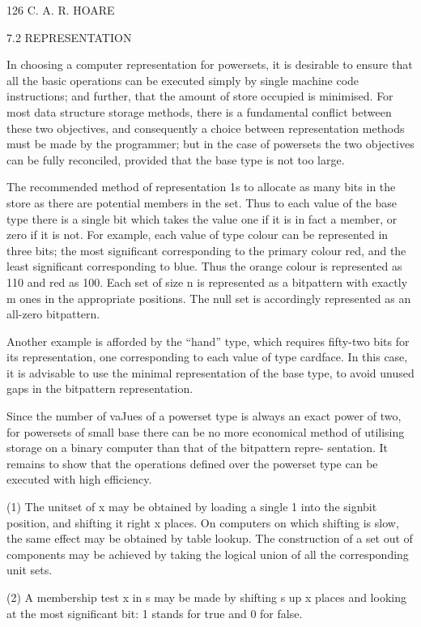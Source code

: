 {{{{				126 C. A. R. HOARE
				
				7.2 REPRESENTATION
				
				In choosing a computer representation for powersets, it is desirable to ensure that all the basic operations can be executed simply by single machine code instructions; and further, that the amount of store occupied is minimised. For most data structure storage methods, there is a fundamental conflict between these two objectives, and consequently a choice between representation methods must be made by the programmer; but in the case of powersets the two objectives can be fully reconciled, provided that the base type is not too large.
				
				The recommended method of representation 1s to allocate as many bits in the store as there are potential members in the set. Thus to each value of the base type there is a single bit which takes the value one if it is in fact a member, or zero if it is not. For example, each value of type colour can be represented in three bits; the most significant corresponding to the primary colour red, and the least significant corresponding to blue. Thus the orange colour is represented as 110 and red as 100. Each set of size n is represented as a bitpattern with exactly m ones in the appropriate positions. The null set is accordingly represented as an all-zero bitpattern.
				
				Another example is afforded by the “hand” type, which requires fifty-two bits for its representation, one corresponding to each value of type cardface. In this case, it is advisable to use the minimal representation of the base type, to avoid unused gaps in the bitpattern representation.
				
				Since the number of vaJues of a powerset type is always an exact power of two, for powersets of small base there can be no more economical method of utilising storage on a binary computer than that of the bitpattern repre- sentation. It remains to show that the operations defined over the powerset type can be executed with high efficiency.
				
				(1) The unitset of x may be obtained by loading a single 1 into the signbit position, and shifting it right x places. On computers on which shifting is slow, the same effect may be obtained by table lookup. The construction of a set out of components may be achieved by taking the logical union of all the corresponding unit sets.
				
				(2) A membership test x in s may be made by shifting s up x places and looking at the most significant bit: 1 stands for true and 0 for false.
				
}}}}
